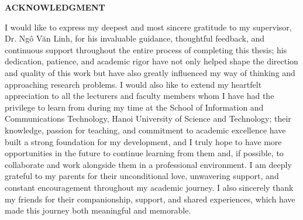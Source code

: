 \documentclass[../main.tex]{subfiles}
\begin{document}
\begin{center}
    \Large{\textbf{ACKNOWLEDGMENT}}\\
\end{center}
\vspace{1cm}
\sloppy

I would like to express my deepest and most sincere gratitude to my supervisor, Dr. Ngô Văn Linh, for his invaluable guidance, thoughtful feedback, and continuous support throughout the entire process of completing this thesis; his dedication, patience, and academic rigor have not only helped shape the direction and quality of this work but have also greatly influenced my way of thinking and approaching research problems. I would also like to extend my heartfelt appreciation to all the lecturers and faculty members whom I have had the privilege to learn from during my time at the School of Information and Communications Technology, Hanoi University of Science and Technology; their knowledge, passion for teaching, and commitment to academic excellence have built a strong foundation for my development, and I truly hope to have more opportunities in the future to continue learning from them and, if possible, to collaborate and work alongside them in a professional environment. I am deeply grateful to my parents for their unconditional love, unwavering support, and constant encouragement throughout my academic journey. I also sincerely thank my friends for their companionship, support, and shared experiences, which have made this journey both meaningful and memorable.
\end{document}
